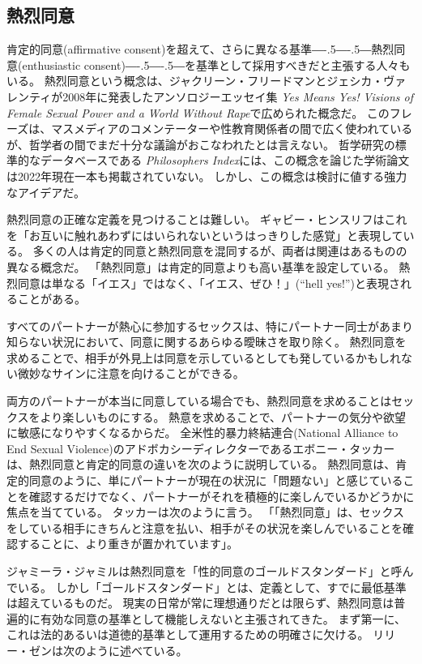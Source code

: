 \documentclass[paper=a4,book,openany]{jlreq}
\newcommand{\ig}[1]{}           %
\def\DDASH{―\kern-.5\zw―\kern-.5\zw―} %
\begin{document}
\subsection{熱烈同意}

肯定的同意(affirmative consent)を超えて、さらに異なる基準{\DDASH}熱烈同意(enthusiastic consent){\DDASH}を基準として採用すべきだと主張する人々もいる。
熱烈同意という概念は、ジャクリーン・フリードマン\ig{Jaclyn Friedman}とジェシカ・ヴァレンティ\ig{Jessica Valenti}が2008年に発表したアンソロジーエッセイ集 \emph{Yes Means Yes! Visions of Female Sexual Power and a World Without Rape}で広められた概念だ\citep[pp.308--309]{friedman08:_yes_means_yes}。
このフレーズは、マスメディアのコメンテーターや性教育関係者の間で広く使われているが、哲学者の間でまだ十分な議論がおこなわれたとは言えない。
哲学研究の標準的なデータベースである \emph{Philosophers Index}には、この概念を論じた学術論文は2022年現在一本も掲載されていない。
しかし、この概念は検討に値する強力なアイデアだ。

熱烈同意の正確な定義を見つけることは難しい。
ギャビー・ヒンスリフ\ig{Gaby Hinsliff}はこれを「お互いに触れあわずにはいられないというはっきりした感覚」と表現している\citep{hinsliff15:_consen_is_not_enoug}。
多くの人は肯定的同意と熱烈同意を混同するが、両者は関連はあるものの異なる概念だ。
「熱烈同意」は肯定的同意よりも高い基準を設定している。
熱烈同意は単なる「イエス」ではなく、「イエス、ぜひ！」(``hell yes!'')と表現されることがある。

すべてのパートナーが熱心に参加するセックスは、特にパートナー同士があまり知らない状況において、同意に関するあらゆる曖昧さを取り除く。
熱烈同意を求めることで、相手が外見上は同意を示しているとしても発しているかもしれない微妙なサインに注意を向けることができる。

両方のパートナーが本当に同意している場合でも、熱烈同意を求めることはセックスをより楽しいものにする。
熱意を求めることで、パートナーの気分や欲望に敏感になりやすくなるからだ。
全米性的暴力終結連合(National Alliance to End Sexual Violence)のアドボカシーディレクターであるエボニー・タッカー\ig{Ebony Tucker}は、熱烈同意と肯定的同意の違いを次のように説明している。
熱烈同意は、肯定的同意のように、単にパートナーが現在の状況に「問題ない」と感じていることを確認するだけでなく、パートナーがそれを積極的に楽しんでいるかどうかに焦点を当てている。
タッカーは次のように言う。
「「熱烈同意」は、セックスをしている相手にきちんと注意を払い、相手がその状況を楽しんでいることを確認することに、より重きが置かれています」\citep{cooney18:_aziz_ansar_alleg_has_peopl}。

ジャミーラ・ジャミル\ig{Jameela Jamil}は熱烈同意を「性的同意のゴールドスタンダード」と呼んでいる\citep{jamil18:_what_we_need_learn_aziz_ansar_clust}。
しかし「ゴールドスタンダード」とは、定義として、すでに最低基準は超えているものだ。
現実の日常が常に理想通りだとは限らず、熱烈同意は普遍的に有効な同意の基準として機能しえないと主張されてきた。
まず第一に、これは法的あるいは道徳的基準として運用するための明確さに欠ける。
リリー・ゼン\ig{Lily Zheng}は次のように述べている。
\end{document}

